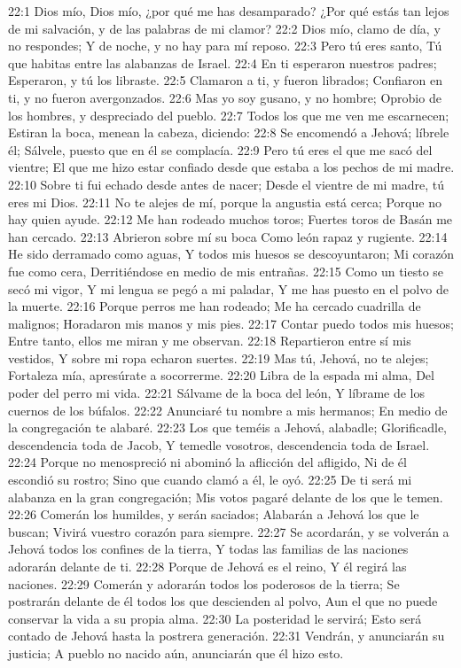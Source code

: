 22:1 Dios mío, Dios mío, ¿por qué me has desamparado? 
¿Por qué estás tan lejos de mi salvación, y de las palabras de mi clamor? 
22:2 Dios mío, clamo de día, y no respondes; 
Y de noche, y no hay para mí reposo. 
22:3 Pero tú eres santo, 
Tú que habitas entre las alabanzas de Israel. 
22:4 En ti esperaron nuestros padres; 
Esperaron, y tú los libraste. 
22:5 Clamaron a ti, y fueron librados; 
Confiaron en ti, y no fueron avergonzados. 
22:6 Mas yo soy gusano, y no hombre; 
Oprobio de los hombres, y despreciado del pueblo. 
22:7 Todos los que me ven me escarnecen; 
Estiran la boca, menean la cabeza,  diciendo: 
22:8 Se encomendó a Jehová; líbrele él; 
Sálvele, puesto que en él se complacía. 
22:9 Pero tú eres el que me sacó del vientre; 
El que me hizo estar confiado desde que estaba a los pechos de mi madre. 
22:10 Sobre ti fui echado desde antes de nacer; 
Desde el vientre de mi madre, tú eres mi Dios. 
22:11 No te alejes de mí, porque la angustia está cerca; 
Porque no hay quien ayude. 
22:12 Me han rodeado muchos toros; 
Fuertes toros de Basán me han cercado. 
22:13 Abrieron sobre mí su boca 
Como león rapaz y rugiente. 
22:14 He sido derramado como aguas, 
Y todos mis huesos se descoyuntaron; 
Mi corazón fue como cera, 
Derritiéndose en medio de mis entrañas. 
22:15 Como un tiesto se secó mi vigor, 
Y mi lengua se pegó a mi paladar, 
Y me has puesto en el polvo de la muerte. 
22:16 Porque perros me han rodeado; 
Me ha cercado cuadrilla de malignos; 
Horadaron mis manos y mis pies. 
22:17 Contar puedo todos mis huesos; 
Entre tanto, ellos me miran y me observan. 
22:18 Repartieron entre sí mis vestidos, 
Y sobre mi ropa echaron suertes. 
22:19 Mas tú, Jehová, no te alejes; 
Fortaleza mía, apresúrate a socorrerme. 
22:20 Libra de la espada mi alma, 
Del poder del perro mi vida. 
22:21 Sálvame de la boca del león, 
Y líbrame de los cuernos de los búfalos. 
22:22 Anunciaré tu nombre a mis hermanos; 
En medio de la congregación te alabaré. 
22:23 Los que teméis a Jehová, alabadle; 
Glorificadle, descendencia toda de Jacob, 
Y temedle vosotros, descendencia toda de Israel. 
22:24 Porque no menospreció ni abominó la aflicción del afligido, 
Ni de él escondió su rostro; 
Sino que cuando clamó a él, le oyó. 
22:25 De ti será mi alabanza en la gran congregación; 
Mis votos pagaré delante de los que le temen. 
22:26 Comerán los humildes, y serán saciados; 
Alabarán a Jehová los que le buscan; 
Vivirá vuestro corazón para siempre. 
22:27 Se acordarán, y se volverán a Jehová todos los confines de la tierra, 
Y todas las familias de las naciones adorarán delante de ti. 
22:28 Porque de Jehová es el reino, 
Y él regirá las naciones. 
22:29 Comerán y adorarán todos los poderosos de la tierra; 
Se postrarán delante de él todos los que descienden al polvo, 
Aun el que no puede conservar la vida a su propia alma. 
22:30 La posteridad le servirá; 
Esto será contado de Jehová hasta la postrera generación. 
22:31 Vendrán, y anunciarán su justicia; 
A pueblo no nacido aún, anunciarán que él hizo esto. 
